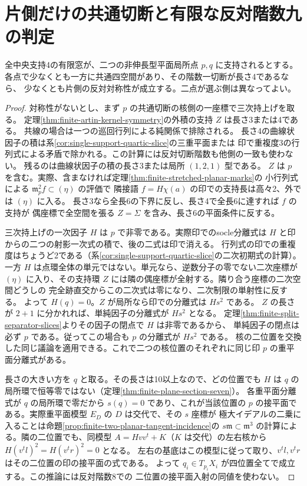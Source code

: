 \section{片側だけの共通切断と有限な反対階数九の判定}
\label{sec:finite-rank-nine-all-marks}
\begin{lemma}\label{lem:quartic-two-marks-incidence}
全中央支持4の有限窓が、二つの非伸長型平面局所点 $p,q$ に支持されるとする。
各点で少なくとも一方に共通四空間があり、その階数一切断が長さ4であるなら、
少なくとも片側の反対対称性が成立する。二点が選ぶ側は異なってよい。
\end{lemma}
\begin{proof}
対称性がないとし、まず $p$ の共通切断の核側の一座標で三次持上げを取る。
定理\ref{thm:finite-artin-kernel-symmetry}の外積の支持 $Z$ は長さ3または4である。
共線の場合は一つの巡回行列による純関係で排除される。
長さ4の曲線状因子の積は系\ref{cor:single-support-quartic-slice}の三重平面または
印で重複度3の行列式による矛盾で除かれる。この計算には反対切断階数も他側の一致も使わない。
残るのは曲線状因子の積の長さ3または局所 $(1,2,1)$ 型である。
$Z$ は $p$ を含む。実際、含まなければ定理\ref{thm:finite-stretched-planar-marks}の
小行列式による $\mathfrak m_p^2 f\subset(\eta)$ の評価で
隣接語 $f=H\chi(a)$ の印での支持長は高々2、外では $(\eta)$ に入る。
長さ3なら全長6の下界に反し、長さ4で全長6に達すれば $f$ の支持が
偶座標で全空間を張る $Z=\Sigma$ を含み、長さ6の平面条件に反する。

三次持上げの一次因子 $H$ は $p$ で非零である。実際印でのsocle分離式は
$H$ と印からの二つの射影一次式の積で、後の二式は印で消える。
行列式の印での重複度はちょうど2である（系\ref{cor:single-support-quartic-slice}の二次初期式の計算）。
一方 $H$ は点環全体の単元ではない。単元なら、逆数分子の零でない二次座標が
$(\eta)$ に入り、その支持環 $Z$ には隣の偶座標が全射する。隣り合う座標の二次空間どうしの
完全跡直交からこの二次式は零になり、二次制限の単射性に反する。
よって $H(q)=0$。$Z$ が局所なら印での分離式は $Hs^2$ である。
$Z$ の長さが $2+1$ に分かれれば、単純因子の分離式が $Hs^2$ となる。
定理\ref{thm:finite-split-separator-slices}よりその因子の閉点で $H$ は非零であるから、
単純因子の閉点は必ず $p$ である。従ってこの場合も $p$ の分離式が $Hs^2$ である。
核の二位置を交換した同じ議論を適用できる。これで二つの核位置のそれぞれに同じ印 $p$ の重平面分離式がある。

長さの大きい方を $q$ と取る。その長さは10以上なので、どの位置でも $H$ は
$q$ の局所環で恒等零ではない（定理\ref{thm:finite-plane-section-seven}）。
各重平面分離式が $q$ の局所環で零だから $s(q)=0$ であり、これが当該位置の
$p$ の接平面である。実際重平面模型 $E_D$ の $D$ は交代で、その $s$ 座標が
極大イデアルの二乗に入ることは命題\ref{prop:finite-two-planar-tangent-incidence}の
$s\mathfrak m\subset\mathfrak m^3$ の計算による。隣の二位置でも、同模型
$A=H vv^t+K$（$K$ は交代）の左右核から $H(v^tl)^2=H(v^tr)^2=0$ となる。
左右の基底はこの模型に従って取り、$v^tl,v^tr$ はその二位置の印の接平面の式である。
よって $q_i\in T_{p_i}X_i$ が四位置全てで成立する。この推論には反対階数8での
二位置の接平面入射の同値を使わない。


\end{proof}

